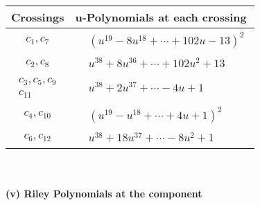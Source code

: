 \documentclass[1p]{elsarticle_modified}
\theoremstyle{definition}
\begin{document}
\begin{tabular}{m{50pt}|m{274pt}}
Crossings & \hspace{64pt}u-Polynomials at each crossing \\
\hline $$\begin{aligned}c_{1},c_{7}\end{aligned}$$&$\begin{aligned}
&(u^{19}-8 u^{18}+\cdots+102 u-13)^{2}
\end{aligned}$\\
\hline $$\begin{aligned}c_{2},c_{8}\end{aligned}$$&$\begin{aligned}
&u^{38}+8 u^{36}+\cdots+102 u^2+13
\end{aligned}$\\
\hline $$\begin{aligned}c_{3},c_{5},c_{9}\\c_{11}\end{aligned}$$&$\begin{aligned}
&u^{38}+2 u^{37}+\cdots-4 u+1
\end{aligned}$\\
\hline $$\begin{aligned}c_{4},c_{10}\end{aligned}$$&$\begin{aligned}
&(u^{19}- u^{18}+\cdots+4 u+1)^{2}
\end{aligned}$\\
\hline $$\begin{aligned}c_{6},c_{12}\end{aligned}$$&$\begin{aligned}
&u^{38}+18 u^{37}+\cdots-8 u^2+1
\end{aligned}$\\
\hline
\end{tabular}\\~\\
\newpage\renewcommand{\arraystretch}{1}
\flushleft \textbf{(v) Riley Polynomials at the component}\newline \\
\end{document}
